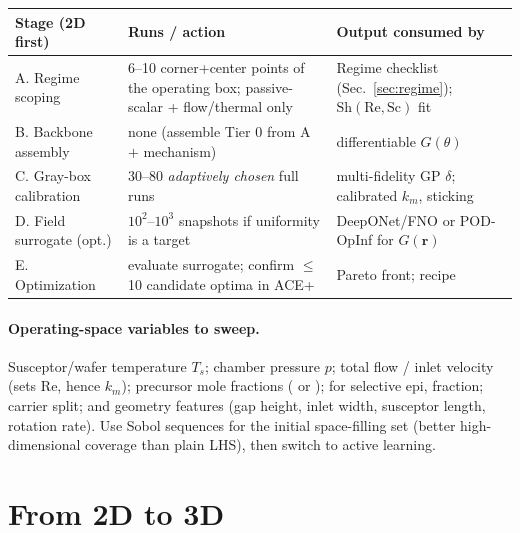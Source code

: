 \documentclass[11pt]{article}
\newcommand{\Sh}{\mathrm{Sh}}
\newcommand{\Rey}{\mathrm{Re}}
\newcommand{\Sc}{\mathrm{Sc}}
\begin{document}
\begin{center}
\renewcommand{\arraystretch}{1.25}
\begin{tabular}{@{}p{3.5cm} p{6.0cm} p{4.5cm}@{}}
\toprule
\textbf{Stage (2D first)} & \textbf{Runs / action} & \textbf{Output consumed by} \\
\midrule
A. Regime scoping & 6--10 corner+center points of the operating box; passive-scalar + flow/thermal only & Regime checklist (Sec.~\ref{sec:regime}); $\Sh(\Rey,\Sc)$ fit \\
B. Backbone assembly & none (assemble Tier 0 from A $+$ mechanism) & differentiable $G(\theta)$ \\
C. Gray-box calibration & 30--80 \emph{adaptively chosen} full runs & multi-fidelity GP $\delta$; calibrated $k_m$, sticking \\
D. Field surrogate (opt.) & $10^2$--$10^3$ snapshots if uniformity is a target & DeepONet/FNO or POD-OpInf for $G(\mathbf r)$ \\
E. Optimization & evaluate surrogate; confirm $\le$10 candidate optima in ACE+ & Pareto front; recipe \\
\bottomrule
\end{tabular}
\end{center}

\paragraph{Operating-space variables to sweep.} Susceptor/wafer temperature $T_s$; chamber pressure $p$; total flow / inlet velocity (sets $\Rey$, hence $k_m$); precursor mole fractions ( or ); for selective epi,  fraction; carrier  split; and geometry features (gap height, inlet width, susceptor length, rotation rate). Use Sobol sequences for the initial space-filling set (better high-dimensional coverage than plain LHS), then switch to active learning.

\section{From 2D to 3D}
\label{sec:2dto3d}
\end{document}
